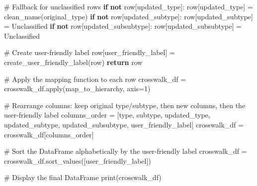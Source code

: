 \documentclass[
  letterpaper,
  DIV=11,
  numbers=noendperiod]{scrartcl}
\newenvironment{Shaded}{\begin{snugshade}}{\end{snugshade}}
\newcommand{\BuiltInTok}[1]{\textcolor[rgb]{0.00,0.23,0.31}{#1}}
\newcommand{\CommentTok}[1]{\textcolor[rgb]{0.37,0.37,0.37}{#1}}
\newcommand{\ControlFlowTok}[1]{\textcolor[rgb]{0.00,0.23,0.31}{\textbf{#1}}}
\newcommand{\DecValTok}[1]{\textcolor[rgb]{0.68,0.00,0.00}{#1}}
\newcommand{\KeywordTok}[1]{\textcolor[rgb]{0.00,0.23,0.31}{\textbf{#1}}}
\newcommand{\NormalTok}[1]{\textcolor[rgb]{0.00,0.23,0.31}{#1}}
\newcommand{\OperatorTok}[1]{\textcolor[rgb]{0.37,0.37,0.37}{#1}}
\newcommand{\StringTok}[1]{\textcolor[rgb]{0.13,0.47,0.30}{#1}}
\begin{document}
\begin{Shaded}
\begin{Highlighting}[]
    \CommentTok{\# Fallback for unclassified rows}
    \ControlFlowTok{if} \KeywordTok{not}\NormalTok{ row[}\StringTok{\textquotesingle{}updated\_type\textquotesingle{}}\NormalTok{]:}
\NormalTok{        row[}\StringTok{\textquotesingle{}updated\_type\textquotesingle{}}\NormalTok{] }\OperatorTok{=}\NormalTok{ clean\_name(original\_type)}
    \ControlFlowTok{if} \KeywordTok{not}\NormalTok{ row[}\StringTok{\textquotesingle{}updated\_subtype\textquotesingle{}}\NormalTok{]:}
\NormalTok{        row[}\StringTok{\textquotesingle{}updated\_subtype\textquotesingle{}}\NormalTok{] }\OperatorTok{=} \StringTok{\textquotesingle{}Unclassified\textquotesingle{}}
    \ControlFlowTok{if} \KeywordTok{not}\NormalTok{ row[}\StringTok{\textquotesingle{}updated\_subsubtype\textquotesingle{}}\NormalTok{]:}
\NormalTok{        row[}\StringTok{\textquotesingle{}updated\_subsubtype\textquotesingle{}}\NormalTok{] }\OperatorTok{=} \StringTok{\textquotesingle{}Unclassified\textquotesingle{}}

    \CommentTok{\# Create user{-}friendly label}
\NormalTok{    row[}\StringTok{\textquotesingle{}user\_friendly\_label\textquotesingle{}}\NormalTok{] }\OperatorTok{=}\NormalTok{ create\_user\_friendly\_label(row)}
    \ControlFlowTok{return}\NormalTok{ row}

\CommentTok{\# Apply the mapping function to each row}
\NormalTok{crosswalk\_df }\OperatorTok{=}\NormalTok{ crosswalk\_df.}\BuiltInTok{apply}\NormalTok{(map\_to\_hierarchy, axis}\OperatorTok{=}\DecValTok{1}\NormalTok{)}

\CommentTok{\# Rearrange columns: keep original type/subtype, then new columns, then the user{-}friendly label}
\NormalTok{columns\_order }\OperatorTok{=}\NormalTok{ [}\StringTok{\textquotesingle{}type\textquotesingle{}}\NormalTok{, }\StringTok{\textquotesingle{}subtype\textquotesingle{}}\NormalTok{, }\StringTok{\textquotesingle{}updated\_type\textquotesingle{}}\NormalTok{, }\StringTok{\textquotesingle{}updated\_subtype\textquotesingle{}}\NormalTok{, }
                 \StringTok{\textquotesingle{}updated\_subsubtype\textquotesingle{}}\NormalTok{, }\StringTok{\textquotesingle{}user\_friendly\_label\textquotesingle{}}\NormalTok{]}
\NormalTok{crosswalk\_df }\OperatorTok{=}\NormalTok{ crosswalk\_df[columns\_order]}
\end{Highlighting}
\end{Shaded}

\begin{Shaded}
\begin{Highlighting}[]
\CommentTok{\# Sort the DataFrame alphabetically by the user{-}friendly label}
\NormalTok{crosswalk\_df }\OperatorTok{=}\NormalTok{ crosswalk\_df.sort\_values([}\StringTok{\textquotesingle{}user\_friendly\_label\textquotesingle{}}\NormalTok{])}

\CommentTok{\# Display the final DataFrame}
\BuiltInTok{print}\NormalTok{(crosswalk\_df)}
\end{Highlighting}
\end{Shaded}
\end{document}
